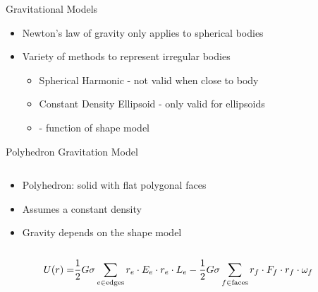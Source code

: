 \begin{frame}{Gravitational Models}
    \begin{center}
        
    \end{center}
    \pause
    \begin{itemize}
        \item Newton's law of gravity only applies to spherical bodies
        \item Variety of methods to represent irregular bodies
            \begin{itemize}
                \item Spherical Harmonic - not valid when close to body
                \item Constant Density Ellipsoid - only valid for ellipsoids
                \item {} - function of shape model 
            \end{itemize}
    \end{itemize}
\end{frame}

\begin{frame}{Polyhedron Gravitation Model}

\begin{columns}
\begin{column}{0.5\textwidth}
\begin{itemize}
    \item Polyhedron: solid with flat polygonal faces
    \item Assumes a constant density
    \item Gravity depends on the shape model
\end{itemize}
\end{column}
\begin{column}{0.5\textwidth}
    \resizebox{\columnwidth}{!}{%
    
}
\end{column}
\end{columns}
\pause
\begin{align*}
    U(r) =& \frac{1}{2} G \sigma \sum_{e \in \text{edges}} r_e \cdot E_e \cdot r_e \cdot L_e - \frac{1}{2}G \sigma \sum_{f \in \text{faces}} r_f \cdot F_f \cdot r_f \cdot \omega_f 
\end{align*}
\end{frame}
